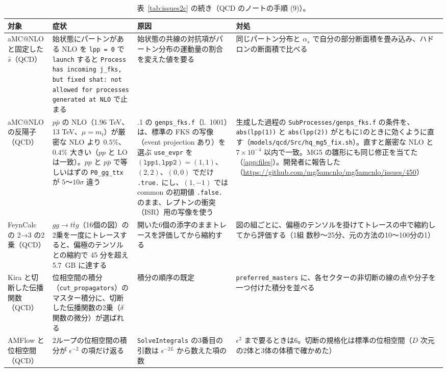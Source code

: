 \documentclass[a4paper,10pt]{ltjsarticle}
\begin{document}
\begin{table}[tbp]
\centering\footnotesize
\caption{表~\ref{tab:issues2c} の続き（QCD のノートの手順 (9)）。}
\label{tab:issues2d}
\begin{tabularx}{\linewidth}{>{\raggedright\arraybackslash}p{2.4cm}>{\raggedright\arraybackslash}X>{\raggedright\arraybackslash}X>{\raggedright\arraybackslash}X}
\toprule
\textbf{対象} & \textbf{症状} & \textbf{原因} & \textbf{対処} \\
\midrule
aMC@NLO と固定した $\hat s$（QCD） & 始状態にパートンがある NLO を \texttt{lpp = 0} で \texttt{launch} すると \texttt{Process has incoming j\_fks, but fixed shat: not allowed for processes generated at NLO} で止まる & 始状態の共線の対抗項がパートン分布の運動量の割合を変えた値を要る & 同じパートン分布と $\alpha_s$ で自分の部分断面積を畳み込み、ハドロンの断面積で比べる \\
aMC@NLO の反陽子（QCD） & $p\bar p$ の NLO（1.96 TeV、13 TeV、$\mu=m_t$）が厳密な NLO より $0.5\%$、$0.4\%$ 大きい（$pp$ と LO は一致）。$pp$ と $p\bar p$ で等しいはずの \texttt{P0\_gg\_ttx} が $5$〜$10\sigma$ 違う & 3.8.1 の \texttt{genps\_fks.f}（l.~1001）は、標準の FKS の写像（event projection あり）を選ぶ \texttt{use\_evpr} を $(\texttt{lpp1},\texttt{lpp2})=(1,1)$、$(2,2)$、$(0,0)$ でだけ \texttt{.true.} にし、$(1,-1)$ では common の初期値 \texttt{.false.} のまま、レプトンの衝突（ISR）用の写像を使う & 生成した過程の \texttt{SubProcesses/genps\_fks.f} の条件を、\texttt{abs(lpp(1))} と \texttt{abs(lpp(2))} がともに1のときに効くように直す（\nolinkurl{models/qcd/Src/hq_mg5_fix.sh}）。直すと厳密な NLO と $7\times10^{-4}$ 以内で一致。MG5 の雛形にも同じ修正を当てた（\ref{app:files}）。開発者に報告した（\url{https://github.com/mg5amcnlo/mg5amcnlo/issues/450}） \\
FeynCalc の 2→3 の2乗（QCD） & $gg\to t\bar tg$（16個の図）の2乗を一度にトレースすると、偏極のテンソルとの縮約で 45 分を超え 5.7~GB に達する & 開いた6個の添字のままトレースを評価してから縮約する & 図の組ごとに、偏極のテンソルを掛けてトレースの中で縮約してから評価する（1組 数秒〜25分、元の方法の10〜100分の1） \\
Kira と切断した伝播関数（QCD） & 位相空間の積分（\texttt{cut\_propagators}）のマスター積分に、切断した伝播関数の2乗（$\delta$ 関数の微分）が選ばれる & 積分の順序の既定 & \texttt{preferred\_masters} に、各セクターの非切断の線の点や分子を一つ付けた積分を並べる \\
AMFlow と位相空間（QCD） & 2ループの位相空間の積分が $\epsilon^{-2}$ の項だけ返る & \texttt{SolveIntegrals} の3番目の引数は $\epsilon^{-2L}$ から数えた項の数 & $\epsilon^2$ まで要るときは6。切断の規格化は標準の位相空間（$D$ 次元の2体と3体の体積で確かめた） \\

\end{tabularx}
\end{table}
\end{document}
